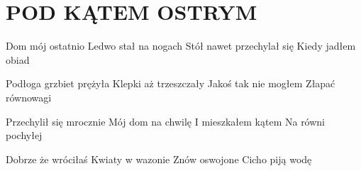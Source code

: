 \documentclass[../../../songbook.tex]{subfiles}
\begin{document}
\TabPositions{7cm} %
\section*{POD KĄTEM OSTRYM}
{}
\vspace{0.5cm}
Dom mój ostatnio				 \newline	  
Ledwo stał na nogach			 \newline	  
Stół nawet przechylał się		 \newline	  
Kiedy jadłem obiad				 \newline	  

Podłoga grzbiet prężyła \newline	 
Klepki aż trzeszczały \newline	 
Jakoś tak nie mogłem \newline	 
Złapać równowagi \newline	 

Przechylił się mrocznie \newline	 
Mój dom na chwilę \newline	 
I mieszkałem kątem \newline	 
Na równi pochyłej \newline	 

Dobrze że wróciłaś \newline	 
Kwiaty w wazonie \newline	 
Znów oswojone \newline	 
Cicho piją wodę  \newline	 
\end{document}
